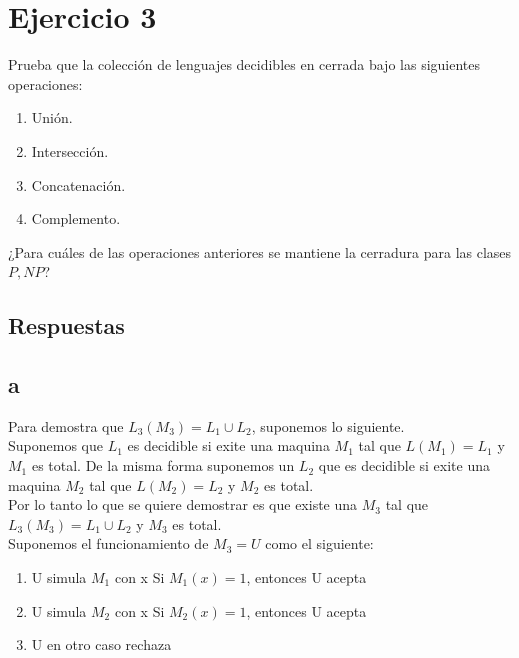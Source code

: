 \section{Ejercicio 3}


\begin{tcolorbox}[enunciado]
Prueba que la colección de lenguajes decidibles en cerrada bajo las siguientes operaciones:
\begin{enumerate}[label=(\alph*)]
    \item Unión.
    \item Intersección.
    \item  Concatenación.
    \item  Complemento.
\end{enumerate}
¿Para cuáles de las operaciones anteriores se mantiene la cerradura para las clases $P,NP$?
\end{tcolorbox}

\subsection{Respuestas}

\subsection*{a}

Para demostra que $L_3(M_3)=L_1 \cup L_2$, suponemos lo siguiente.\\

Suponemos que $L_1$ es decidible si exite una maquina $M_1$ tal que $L(M_1) = L_1$ y $M_1$ es total. De la misma forma suponemos un $L_2$ que es decidible si exite una maquina $M_2$ tal que $L(M_2) = L_2$ y $M_2$ es total.\\

Por lo tanto lo que se quiere demostrar es que existe una $M_3$ tal que $L_3(M_3) = L_1 \cup L_2$ y $M_3$ es total.\\

Suponemos el funcionamiento de $M_3 = U$ como el siguiente:
\begin{enumerate}
    \item U simula $M_1$ con x
        Si $M_1(x) = 1$, entonces U acepta
    \item U simula $M_2$ con x
        Si $M_2(x) = 1$, entonces U acepta
    \item U en otro caso rechaza
\end{enumerate}

